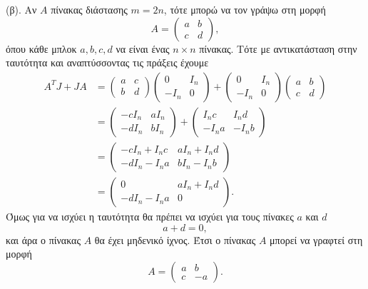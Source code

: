 \begin{solution}
    (β). Αν \( A \) πίνακας διάστασης \( m = 2n \), τότε μπορώ να τον γράψω στη
    μορφή
    \[
        A =
        \begin{pmatrix}
            a & b \\
            c & d
        \end{pmatrix},
    \]
    όπου κάθε μπλοκ \( a, b, c, d \) να είναι ένας \( n \times n \) πίνακας.
    Τότε με αντικατάσταση στην ταυτότητα και αναπτύσσοντας τις πράξεις έχουμε
    \begin{align*}
        A^{T}J + JA &=
        \begin{pmatrix}
            a & c \\
            b & d
        \end{pmatrix}
        \begin{pmatrix}
            0 & I_n \\
            -I_n & 0
        \end{pmatrix} +
        \begin{pmatrix}
            0 & I_n \\
            -I_n & 0
        \end{pmatrix}
        \begin{pmatrix}
            a & b \\
            c & d
        \end{pmatrix} \\
        &=\begin{pmatrix}
            -cI_n & aI_n \\
            -dI_n & bI_n
        \end{pmatrix} +
        \begin{pmatrix}
            I_{n}c & I_{n}d \\
            -I_{n}a & -I_{n}b
        \end{pmatrix}\\
        &=\begin{pmatrix}
            -cI_n + I_{n}c & aI_n + I_{n}d\\
            -dI_n - I_{n}a & bI_n -I_{n}b
        \end{pmatrix} \\
        &=\begin{pmatrix}
            0 & aI_n + I_{n}d\\
            -dI_n - I_{n}a & 0
        \end{pmatrix}.
    \end{align*}
    Όμως για να ισχύει η ταυτότητα θα πρέπει να ισχύει για τους πίνακες
    \( a \) και \( d \)
    \[
        a + d = 0,
    \]
    και άρα ο πίνακας \( A \) θα έχει μηδενικό ίχνος. Έτσι ο πίνακας \( A \)
    μπορεί να γραφτεί στη μορφή
    \[
        A =
        \begin{pmatrix}
            a & b \\
            c & -a
        \end{pmatrix}.
    \]


\end{solution}
